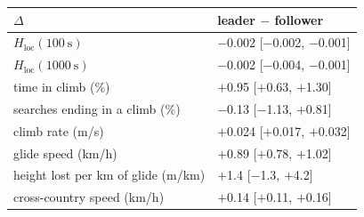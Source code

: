 \begin{tabular}{@{}l l@{}}
\toprule
$\Delta$ & leader $-$ follower \\
\midrule
$H_\mathrm{loc}(100~\mathrm{s})$ & $-$0.002 [$-$0.002, $-$0.001] \\
$H_\mathrm{loc}(1000~\mathrm{s})$ & $-$0.002 [$-$0.004, $-$0.001] \\
time in climb (\%) & $+$0.95 [$+$0.63, $+$1.30] \\
searches ending in a climb (\%) & $-$0.13 [$-$1.13, $+$0.81] \\
climb rate (m/s) & $+$0.024 [$+$0.017, $+$0.032] \\
glide speed (km/h) & $+$0.89 [$+$0.78, $+$1.02] \\
height lost per km of glide (m/km) & $+$1.4 [$-$1.3, $+$4.2] \\
cross-country speed (km/h) & $+$0.14 [$+$0.11, $+$0.16] \\
\bottomrule
\end{tabular}
